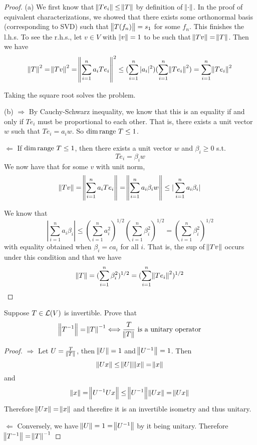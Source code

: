 \documentclass{extarticle}
\begin{document}
\begin{proof}
(a) We first know that \(\norm{T e_i} \leq \norm{T}\) by definition of \(\norm{\cdot}\). In the proof 
of equivalent characterizations, we showed that there exists some orthonormal basis (corresponding to SVD)
such that \(\norm{T(f_n)} = s_1\) for some \(f_n\). This finishes the l.h.s. To see the r.h.s., 
let \(v \in V\) with \(\norm{v} = 1\) to be such that \(\norm{Tv} = \norm{T}\). Then we have 
\begin{align*}
    \norm{T}^2 = \norm{Tv}^2 = \norm{ \sum_{i=1}^{n} a_i  Te_i}^2
    \leq (\sum_{i=1}^{n} |a_i|^2) (\sum_{i=1}^{n} \norm{Te_i}^2) 
    = \sum_{i=1}^{n} \norm{Te_i}^2
\end{align*}

Taking the square root solves the problem. 

(b) \(\Rightarrow\) By Cauchy-Schwarz inequality, we know that this is an equality if and only if 
\(Te_i\) must be proportional to each other. That is, there exists 
a unit vector \(w\) such that \(Te_i = a_i w\). So \(\dim \text{range } T \leq 1\). 


\(\Leftarrow\) If \(\dim \text{range } T \leq 1\), then there exists a unit vector \(w\) and 
\(\beta_i \geq 0\) s.t. 
\[Te_i = \beta_i w\]
We now have that for some \(v\) with unit norm, 
\[\norm{Tv} = \norm{\sum_{i=1}^{n} a_i T e_i} = 
\norm{\sum_{i=1}^{n}a_i \beta_i w} \leq |\sum_{i=1}^{n} a_i \beta_i|\]

We know that 
\[|\sum_{i=1}^{n} a_i \beta_i| \leq (\sum_{i=1}^{n} a_i^2)^{1/2} (\sum_{i=1}^{n} \beta_i^2)^{1/2} 
= (\sum_{i=1}^{n} \beta_i^2)^{1/2}\]
with equality obtained when \(\beta_i = c a_i\) for all \(i\). That is, the sup of \(\norm{Tv}\) 
occurs under this condition and that we have 
\[\norm{T} = (\sum_{i=1}^{n} \beta_i^2)^{1/2} = (\sum_{i=1}^{n} \norm{Te_i}^2)^{1/2}\]
\end{proof}


\begin{problem}{24}
    Suppose \(T \in \mathcal{L}(V)\) is invertible. Prove that 
    \[\norm{T^{-1}} = \norm{T}^{-1} \Longleftrightarrow \frac{T}{\norm{T}} \text{ is a unitary operator}\]
\end{problem}

\begin{proof}
\(\Rightarrow\) Let \(U = \frac{T}{\norm{T}}\), then \(\norm{U} = 1\) and \(\norm{U^{-1}} = 1\). Then 
\[\norm{Ux} \leq \norm{U}\norm{x} = \norm{x}\]
and 
\[\norm{x} = \norm{U^{-1}Ux} \leq \norm{U^{-1}}\norm{Ux} = \norm{Ux}\]
Therefore \(\norm{Ux} = \norm{x}\) and therefire it is an invertible isometry and thus unitary. 

\(\Leftarrow\) Conversely, we have \(\norm{U} = 1 = \norm{U^{-1}}\) by it being unitary. Therefore 
\(\norm{T^{-1}} = \norm{T}^{-1}\)
\end{proof}
\end{document}
